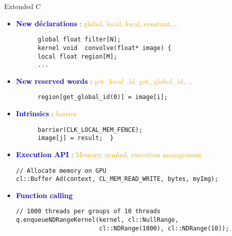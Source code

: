 \documentclass{beamer}
\begin{document}
\begin{frame}[containsverbatim]{Extended C}

  \begin{itemize}
  \item \textbf{\textcolor{blue}{New déclarations}} : \textcolor{orange}{\small global, local, local, constant,...}
    \begin{lstlisting}
      global float filter[N];
      kernel void  convolve(float* image) {
      local float region[M];
      ...
    \end{lstlisting}
  \item \textbf{\textcolor{blue}{New reserved words}} : 
    \textcolor{orange}{\small get\_local\_id, get\_global\_id, \ldots}
    \begin{lstlisting}
      region[get_global_id(0)] = image[i];
    \end{lstlisting}
  \item \textbf{\textcolor{blue}{Intrinsics}} : 
    \textcolor{orange}{\small barrier}
    \begin{lstlisting}
      barrier(CLK_LOCAL_MEM_FENCE);
      image[j] = result;  }
  \end{lstlisting}
  \item \textbf{\textcolor{blue}{Execution API}} :
    \textcolor{orange}{\small Memory, symbol, execution management}
    \begin{lstlisting}
// Allocate memory on GPU
cl::Buffer Ad(context, CL_MEM_READ_WRITE, bytes, myImg);
    \end{lstlisting}
  \item \textcolor{blue}{\bf Function calling}
    \begin{lstlisting}
// 1000 threads per groups of 10 threads
q.enqueueNDRangeKernel(kernel, cl::NullRange, 
                       cl::NDRange(1000), cl::NDRange(10));
    \end{lstlisting}
  \end{itemize}
\end{frame}
\end{document}
